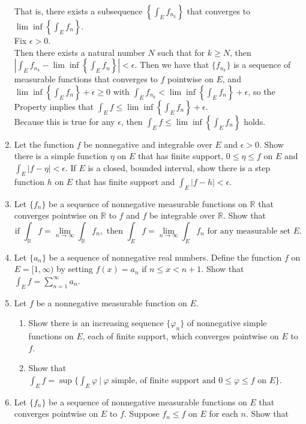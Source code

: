 \begin{enumerate}
    That is, there exists a subsequence $\left\{\int_Ef_{n_k}\right\}$ that converges to $\lim\inf\left\{\int_Ef_n\right\}$.
    \\Fix $\epsilon>0$.
    \\Then there exists a natural number $N$ such that for $k\ge N$, then $\left|\int_Ef_{n_k}-\lim\inf\left\{\int_Ef_n\right\}\right|<\epsilon$.
    Then we have that $\{f_{n_k}\}$ is a sequence of measurable functions that converges to $f$ pointwise on $E$, and $\lim\inf\left\{\int_Ef_n\right\}+\epsilon\ge0$ with $\int_Ef_{n_k}<\lim\inf\left\{\int_Ef_n\right\}+\epsilon$,
    so the Property implies that $\int_E f\le\lim\inf\left\{\int_Ef_n\right\}+\epsilon$.
    \\Because this is true for any $\epsilon$, then $\int_E f\le\lim\inf\left\{\int_Ef_n\right\}$ holds.
    \item Let the function $f$ be nonnegative and integrable over $E$ and $\epsilon>0$. Show there is a simple function $\eta$ on $E$ that has finite support, $0\le\eta\le f$ on $E$ and $\int_E|f-\eta|<\epsilon$.
    If $E$ is a closed, bounded interval, show there is a step function $h$ on $E$ that has finite support and $\int_E|f-h|<\epsilon$.
    \item Let $\{f_n\}$ be a sequence of nonnegative measurable functions on $\mathbb{R}$ that converges pointwise on $\mathbb{R}$ to $f$ and $f$ be integrable over $\mathbb{R}$. Show that
    \[
        \text{if }\int_{\mathbb{R}}f=\lim_{n\to\infty}\int_{\mathbb{R}}f_n,\text{ then }\int_Ef=\lim_{n\to\infty}\int_Ef_n\text{ for any measurable set }E.    
    \]
    \item Let $\{a_n\}$ be a sequence of nonnegative real numbers. Define the function $f$ on $E=[1,\infty)$ by setting $f(x)=a_n$ if $n\le x<n+1$. Show that $\int_Ef=\sum_{n=1}^\infty a_n$.
    \item Let $f$ be a nonnegative measurable function on $E$.
    \begin{enumerate}[label=(\roman*),align=left]
        \item Show there is an increasing sequence $\{\varphi_n\}$ of nonnegative simple functions on $E$, each of finite support, which converges pointwise on $E$ to $f$.
        \item Show that $\int_Ef=\sup\{\int_E\varphi\ |\ \varphi\text{ simple, of finite support and }0\le\varphi\le f\text{ on }E\}$.
    \end{enumerate}
    \item Let $\{f_n\}$ be a sequence of nonnegative measurable functions on $E$ that converges pointwise on $E$ to $f$. Suppose $f_n\le f$ on $E$ for each $n$. Show that

\end{enumerate}
